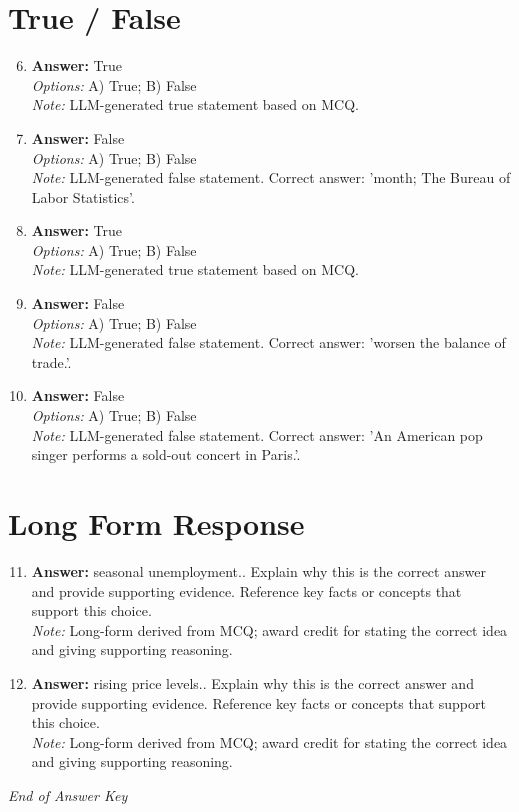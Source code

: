 \documentclass[12pt]{article}
\begin{document}
\section*{True / False}
\begin{enumerate}[label=\arabic*.]
\setcounter{enumi}{5}
\item \textbf{Answer:} True
\\ \textit{Options:} A) True; B) False
\\ \textit{Note:} LLM-generated true statement based on MCQ.
\item \textbf{Answer:} False
\\ \textit{Options:} A) True; B) False
\\ \textit{Note:} LLM-generated false statement. Correct answer: 'month; The Bureau of Labor Statistics'.
\item \textbf{Answer:} True
\\ \textit{Options:} A) True; B) False
\\ \textit{Note:} LLM-generated true statement based on MCQ.
\item \textbf{Answer:} False
\\ \textit{Options:} A) True; B) False
\\ \textit{Note:} LLM-generated false statement. Correct answer: 'worsen the balance of trade.'.
\item \textbf{Answer:} False
\\ \textit{Options:} A) True; B) False
\\ \textit{Note:} LLM-generated false statement. Correct answer: 'An American pop singer performs a sold-out concert in Paris.'.
\end{enumerate}

\section*{Long Form Response}
\begin{enumerate}[label=\arabic*.]
\setcounter{enumi}{10}
\item \textbf{Answer:} seasonal unemployment.. Explain why this is the correct answer and provide supporting evidence. Reference key facts or concepts that support this choice.
\\ \textit{Note:} Long-form derived from MCQ; award credit for stating the correct idea and giving supporting reasoning.
\item \textbf{Answer:} rising price levels.. Explain why this is the correct answer and provide supporting evidence. Reference key facts or concepts that support this choice.
\\ \textit{Note:} Long-form derived from MCQ; award credit for stating the correct idea and giving supporting reasoning.
\end{enumerate}

\vfill
\noindent\textit{End of Answer Key}
\end{document}
